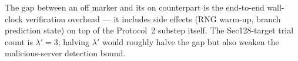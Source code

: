 The gap between an \textsf{off} marker and its \textsf{on}
counterpart is the end-to-end wall-clock verification overhead --- it
includes side effects (RNG warm-up, branch prediction state) on top of
the Protocol~2 substep itself. The Sec128-target trial count is
$\lambda' = 3$; halving $\lambda'$ would roughly halve the gap but also
weaken the malicious-server detection bound.
